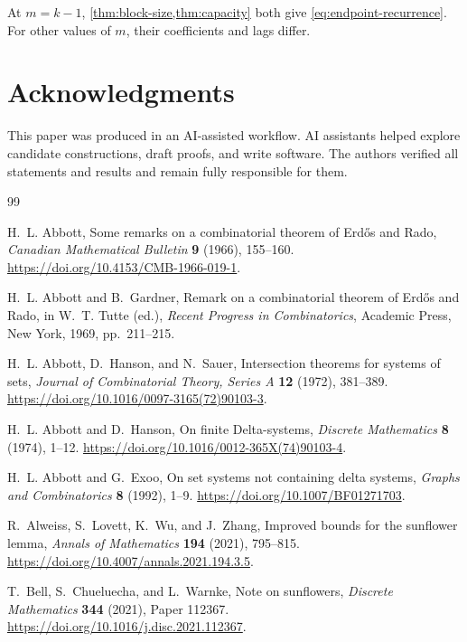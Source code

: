 \documentclass[11pt]{article}
\numberwithin{equation}{section}
\theoremstyle{definition}
\theoremstyle{remark}
\begin{document}
At $m=k-1$, \cref{thm:block-size,thm:capacity} both give
\cref{eq:endpoint-recurrence}. For other values of $m$, their coefficients
and lags differ.

\section*{Acknowledgments}

This paper was produced in an AI-assisted workflow. AI assistants helped
explore candidate constructions, draft proofs, and write software. The
authors verified all statements and results and remain fully responsible for
them.


\begin{thebibliography}{99}

H.~L. Abbott,
\newblock Some remarks on a combinatorial theorem of Erd\H{o}s and Rado,
\newblock \emph{Canadian Mathematical Bulletin} \textbf{9} (1966), 155--160.
\newblock \url{https://doi.org/10.4153/CMB-1966-019-1}.

H.~L. Abbott and B.~Gardner,
\newblock Remark on a combinatorial theorem of Erd\H{o}s and Rado,
\newblock in W.~T. Tutte (ed.), \emph{Recent Progress in Combinatorics},
  Academic Press, New York, 1969, pp.~211--215.

H.~L. Abbott, D.~Hanson, and N.~Sauer,
\newblock Intersection theorems for systems of sets,
\newblock \emph{Journal of Combinatorial Theory, Series A} \textbf{12}
  (1972), 381--389.
\newblock \url{https://doi.org/10.1016/0097-3165(72)90103-3}.

H.~L. Abbott and D.~Hanson,
\newblock On finite Delta-systems,
\newblock \emph{Discrete Mathematics} \textbf{8} (1974), 1--12.
\newblock \url{https://doi.org/10.1016/0012-365X(74)90103-4}.

H.~L. Abbott and G.~Exoo,
\newblock On set systems not containing delta systems,
\newblock \emph{Graphs and Combinatorics} \textbf{8} (1992), 1--9.
\newblock \url{https://doi.org/10.1007/BF01271703}.

R.~Alweiss, S.~Lovett, K.~Wu, and J.~Zhang,
\newblock Improved bounds for the sunflower lemma,
\newblock \emph{Annals of Mathematics} \textbf{194} (2021), 795--815.
\newblock \url{https://doi.org/10.4007/annals.2021.194.3.5}.

T.~Bell, S.~Chueluecha, and L.~Warnke,
\newblock Note on sunflowers,
\newblock \emph{Discrete Mathematics} \textbf{344} (2021), Paper 112367.
\newblock \url{https://doi.org/10.1016/j.disc.2021.112367}.


\end{thebibliography}
\end{document}
